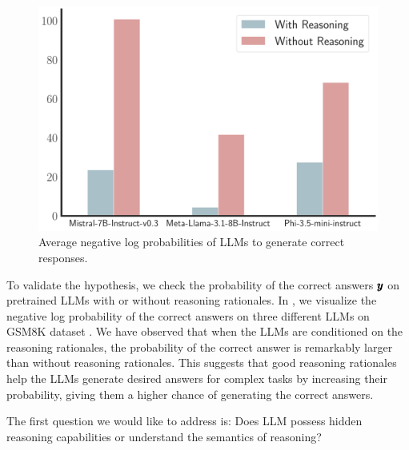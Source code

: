 \begin{figure}
    \centering
    \includegraphics[width=\linewidth]{figures/logprob_diff.pdf}
    \vspace{-1em}
    \caption{\footnotesize{Average negative log probabilities of  LLMs to generate correct responses.}}
    \label{fig:logprob_comparison}
    \vspace{-3em}
\end{figure}

To validate the hypothesis, we check the probability of the correct answers $\pmb{y}$ on pretrained LLMs with or without reasoning rationales.
In ,
we visualize the negative log probability of the correct answers on three different LLMs on GSM8K dataset \citep{cobbe2021training}.
We have observed that when the LLMs are conditioned on the reasoning rationales, the probability of the correct answer is remarkably larger than without reasoning rationales.
This suggests that good reasoning rationales help the LLMs generate desired answers for complex tasks by increasing their probability, giving them a higher chance of generating the correct answers. 

\iffalse
The first question we would like to address is: Does LLM possess hidden reasoning capabilities or understand the semantics of reasoning?

